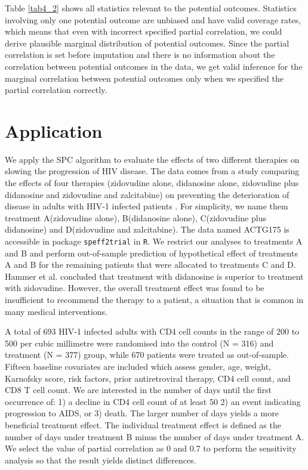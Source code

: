 	Table \ref{tab4_2} shows all statistics relevant to the potential outcomes. Statistics involving only one potential outcome are unbiased and have valid coverage rates, which means that even with incorrect specified partial correlation, we could derive plausible marginal distribution of potential outcomes. Since the partial correlation is set before imputation and there is no information about the correlation between potential outcomes in the data, we get valid inference for the marginal correlation between potential outcomes only when we specified the partial correlation correctly.    
	
	\section{Application}
	\label{sec:4.6}
	We apply the SPC algorithm to evaluate the effects of two different therapies on slowing the progression of HIV disease. The data comes from a study comparing the effects of four therapies (zidovudine alone, didanosine alone, zidovudine plus didanosine and zidovudine and zalcitabine) on preventing the deterioration of disease in adults with HIV-1 infected patients \citep{hammer1996trial}. For simplicity, we name them treatment A(zidovudine alone), B(didanosine alone), C(zidovudine plus didanosine) and D(zidovudine and zalcitabine). The data named ACTG175 is accessible in package \texttt{speff2trial} in \texttt{R}. We restrict our analyses to treatments A and B and perform out-of-sample prediction of hypothetical effect of treatments A and B for the remaining patients that were allocated to treatments C and D. Hammer et al. concluded that treatment with didanosine is superior to treatment with zidovudine. However, the overall treatment effect was found to be insufficient to recommend the therapy to a patient, a situation that is common in many medical interventions. 
	
	A total of 693 HIV-1 infected adults with CD4 cell counts in the range of 200 to 500 per cubic millimetre were randomised into the control (N = 316) and treatment (N = 377) group, while 670 patients were treated as out-of-sample. Fifteen baseline covariates are included which assess gender, age, weight, Karnofsky score, risk factors, prior antiretroviral therapy, CD4 cell count, and CD8 T cell count. We are interested in the number of days until the first occurrence of: 1) a decline in CD4 cell count of at least 50 2) an event indicating progression to AIDS, or 3) death. The larger number of days yields a more beneficial treatment effect. The individual treatment effect is defined as the number of days under treatment B minus the number of days under treatment A. We select the value of partial correlation as 0 and 0.7 to perform the sensitivity analysis so that the result yields distinct differences. 
	
